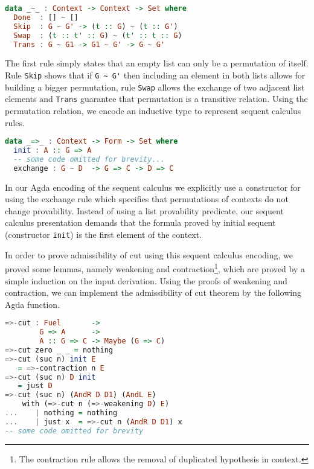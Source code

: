 \begin{lstlisting}[language=haskell]
data _~_ : Context -> Context -> Set where
  Done  : [] ~ []
  Skip  : G ~ G' -> (t :: G) ~ (t :: G')
  Swap  : (t :: t' :: G) ~ (t' :: t :: G)
  Trans : G ~ G1 -> G1 ~ G' -> G ~ G'
\end{lstlisting}

The first rule simply states that an empty list can only be a permutation of itself. Rule \lstinline|Skip|
shows that if \lstinline|G ~ G'| then including an element in both lists allows for building a bigger
permutation, rule \lstinline|Swap| allows the exchange of two adjacent list elements and \lstinline|Trans|
guarantee that permutation is a transitive relation. Using the permutation relation, we encode an
inductive type to represent sequent calculus rules.

\begin{lstlisting}[language=haskell]
data _=>_ : Context -> Form -> Set where
  init : A :: G => A
  -- some code omitted for brevity...
  exchange : G ~ D  -> G => C -> D => C
\end{lstlisting}

In our Agda encoding of the sequent calculus we explicitly use a constructor for using the exchange rule
which specifies that permutations of contexts do not change provability. Instead of using a list provability
predicate, our sequent calculus presentation demands that the formula proved by initial sequent
(constructor \lstinline|init|) is the first element of the context.


In order to prove admissibility of cut using this sequent calculus encoding, we proved some lemmas, namely weakening
and contraction\footnote{The contraction rule allows the removal of duplicated hypothesis in context.}, which are
proved by a simple induction on the input derivation. Using the proofs of weakening and contraction, we can implement
the admissibility of cut theorem by the following Agda function.



\begin{lstlisting}[language=haskell]
=>-cut : Fuel       ->
        G => A      ->
        A :: G => C -> Maybe (G => C)
=>-cut zero _ _ = nothing
=>-cut (suc n) init E
   = =>-contraction n E
=>-cut (suc n) D init
   = just D
=>-cut (suc n) (AndR D D1) (AndL E)
    with (=>-cut n (=>-weakening D) E)
...    | nothing = nothing
...    | just x  = =>-cut n (AndR D D1) x
-- some code omitted for brevity
\end{lstlisting}



